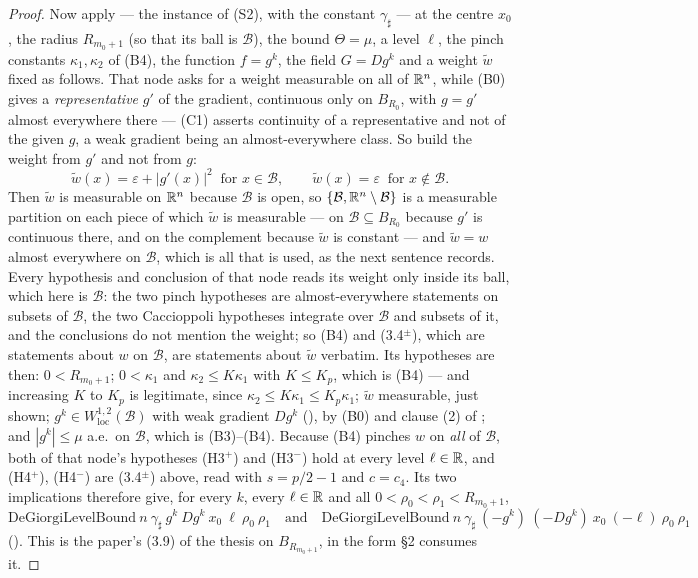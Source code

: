 \begin{proof}
Now apply  --- the instance of (S2), with
the constant $\gamma_\sharp$ --- at the centre $x_0$, the radius $R_{m_0+1}$ (so
that its ball is $\mathcal B$), the bound $\Theta=\mu$, a level $\ell$, the pinch
constants $\kappa_1,\kappa_2$ of (B4), the function $f=g^k$, the field
$G=Dg^k$ and a weight $\widetilde w$ fixed as follows.  That node asks for a
weight measurable on all of $\mathbb{R}^n$, while (B0) gives a \emph{representative}
$g'$ of the gradient, continuous only on $B_{R_0}$, with $g=g'$ almost
everywhere there --- (C1) asserts continuity of a representative and not of the
given $g$, a weak gradient being an almost-everywhere class.  So build the
weight from $g'$ and not from $g$:
\[
\widetilde w(x)=\varepsilon+|g'(x)|^2\ \text{ for }x\in\mathcal B,
\qquad
\widetilde w(x)=\varepsilon\ \text{ for }x\notin\mathcal B .
\]
Then $\widetilde w$ is measurable on $\mathbb{R}^n$ because
$\mathcal B$ is open, so $\{\mathcal B,\mathbb{R}^n\setminus\mathcal B\}$ is a
measurable partition on each piece of which $\widetilde w$ is measurable --- on
$\mathcal B\subseteq B_{R_0}$ because $g'$ is continuous there, and on the
complement because $\widetilde w$ is constant --- and $\widetilde w=w$ almost
everywhere on $\mathcal B$, which is all that is used, as the next sentence
records.  Every hypothesis and conclusion of that node reads its weight
only inside its ball, which here is $\mathcal B$: the two pinch hypotheses are
almost-everywhere statements on subsets of $\mathcal B$, the two Caccioppoli
hypotheses integrate over $\mathcal B$ and subsets of it, and the conclusions do
not mention the weight; so (B4) and (3.4$^\pm$), which are statements about $w$
on $\mathcal B$, are statements about $\widetilde w$ verbatim.  Its hypotheses
are then: $0<R_{m_0+1}$; $0<\kappa_1$ and $\kappa_2\le K\kappa_1$ with
$K\le K_p$, which is (B4) --- and increasing $K$ to $K_p$ is legitimate, since
$\kappa_2\le K\kappa_1\le K_p\kappa_1$; $\widetilde w$ measurable, just shown;
$g^k\in W^{1,2}_{\mathrm{loc}}(\mathcal B)$ with weak gradient $Dg^k$
(), by (B0) and clause (2) of
; and $|g^k|\le\mu$ a.e.\ on $\mathcal B$, which is
(B3)--(B4).  Because (B4) pinches $w$ on \emph{all} of $\mathcal B$, both of that
node's hypotheses (H3$^+$) and (H3$^-$) hold at every level $\ell\in\mathbb{R}$, and
(H4$^+$), (H4$^-$) are (3.4$^\pm$) above, read with $s=p/2-1$ and $c=c_4$.  Its
two implications therefore give, for every $k$, every $\ell\in\mathbb{R}$ and all
$0<\rho_0<\rho_1<R_{m_0+1}$,
\[
\mathrm{DeGiorgiLevelBound}\ n\ \gamma_\sharp\ g^k\ Dg^k\ x_0\ \ell\ \rho_0\ \rho_1
\quad\text{and}\quad
\mathrm{DeGiorgiLevelBound}\ n\ \gamma_\sharp\ (-g^k)\ (-Dg^k)\ x_0\ (-\ell)\
\rho_0\ \rho_1
\]
().  This is the paper's (3.9) of the thesis on
$B_{R_{m_0+1}}$, in the form \S2 consumes it.


\end{proof}
